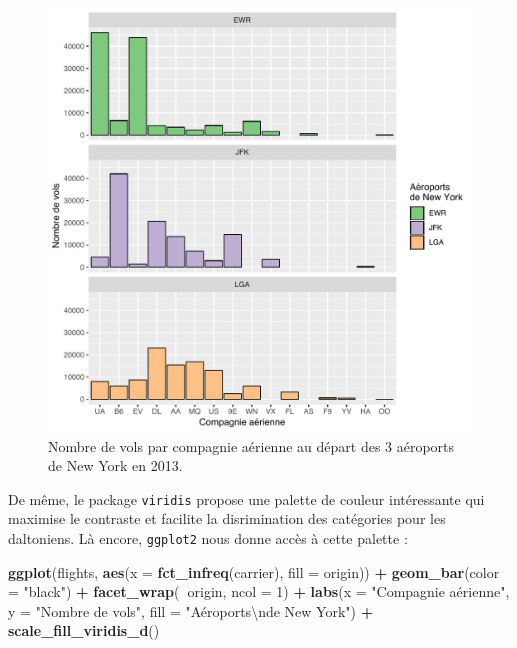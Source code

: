 \documentclass[a4paperpaper,]{article}
\newenvironment{Shaded}{\begin{snugshade}}{\end{snugshade}}
\newcommand{\KeywordTok}[1]{\textcolor[rgb]{0.13,0.29,0.53}{\textbf{#1}}}
\newcommand{\DataTypeTok}[1]{\textcolor[rgb]{0.13,0.29,0.53}{#1}}
\newcommand{\DecValTok}[1]{\textcolor[rgb]{0.00,0.00,0.81}{#1}}
\newcommand{\CharTok}[1]{\textcolor[rgb]{0.31,0.60,0.02}{#1}}
\newcommand{\StringTok}[1]{\textcolor[rgb]{0.31,0.60,0.02}{#1}}
\newcommand{\OperatorTok}[1]{\textcolor[rgb]{0.81,0.36,0.00}{\textbf{#1}}}
\newcommand{\NormalTok}[1]{#1}
\theoremstyle{definition}
\theoremstyle{definition}
\theoremstyle{definition}
\theoremstyle{remark}
\begin{document}
\begin{figure}[htpb]

{\centering \includegraphics[width=0.9\linewidth]{figure/barfacetbrewer-1} 

}

\caption{Nombre de vols par compagnie aérienne au départ des 3 aéroports de New York en 2013.}\label{fig:barfacetbrewer}
\end{figure}

De même, le package \texttt{viridis} propose une palette de couleur
intéressante qui maximise le contraste et facilite la disrimination des
catégories pour les daltoniens. Là encore, \texttt{ggplot2} nous donne
accès à cette palette :

\begin{Shaded}
\begin{Highlighting}[]
\KeywordTok{ggplot}\NormalTok{(flights, }\KeywordTok{aes}\NormalTok{(}\DataTypeTok{x =} \KeywordTok{fct_infreq}\NormalTok{(carrier), }\DataTypeTok{fill =}\NormalTok{ origin)) }\OperatorTok{+}
\StringTok{  }\KeywordTok{geom_bar}\NormalTok{(}\DataTypeTok{color =} \StringTok{"black"}\NormalTok{) }\OperatorTok{+}
\StringTok{  }\KeywordTok{facet_wrap}\NormalTok{(}\OperatorTok{~}\NormalTok{origin, }\DataTypeTok{ncol =} \DecValTok{1}\NormalTok{) }\OperatorTok{+}
\StringTok{  }\KeywordTok{labs}\NormalTok{(}\DataTypeTok{x =} \StringTok{"Compagnie aérienne"}\NormalTok{,}
       \DataTypeTok{y =} \StringTok{"Nombre de vols"}\NormalTok{,}
       \DataTypeTok{fill =} \StringTok{"Aéroports}\CharTok{\textbackslash{}n}\StringTok{de New York"}\NormalTok{) }\OperatorTok{+}
\StringTok{  }\KeywordTok{scale_fill_viridis_d}\NormalTok{()}
\end{Highlighting}
\end{Shaded}
\end{document}
